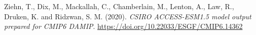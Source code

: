 \documentclass[12pt,oneside,a4paper]{reedthesis}
\newlength{\cslhangindent}
\newenvironment{CSLReferences}[2] %
 {%
  \setlength{\parindent}{0pt}
  \ifodd #1 \everypar{\setlength{\hangindent}{\cslhangindent}}\ignorespaces\fi
  \ifnum #2 > 0
  \setlength{\parskip}{#2\baselineskip}
  \fi
 }%
 {}
\begin{document}
\begin{CSLReferences}{1}{0}
\leavevmode{}%
Ziehn, T., Dix, M., Mackallah, C., Chamberlain, M., Lenton, A., Law, R., Druken, K. and Ridzwan, S. M. (2020). \emph{CSIRO ACCESS-ESM1.5 model output prepared for CMIP6 DAMIP}. \url{https://doi.org/10.22033/ESGF/CMIP6.14362}

\end{CSLReferences}


\end{document}
